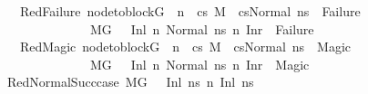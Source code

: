 \begin{isabellebody}
\ \ {\isacharbar}{\kern0pt}\ RedFailure{\isacharcolon}{\kern0pt}\ {\isachardoublequoteopen}{\isasymlbrakk}node{\isacharunderscore}{\kern0pt}to{\isacharunderscore}{\kern0pt}block{\isacharparenleft}{\kern0pt}G{\isacharparenright}{\kern0pt}\ {\isacharbang}{\kern0pt}\ n\ {\isacharequal}{\kern0pt}\ cs{\isacharsemicolon}{\kern0pt}\ M{\isacharcomma}{\kern0pt}{\isasymLambda}{\isacharcomma}{\kern0pt}{\isasymGamma}{\isacharcomma}{\kern0pt}{\isasymOmega}\ {\isasymturnstile}\ {\isasymlangle}cs{\isacharcomma}{\kern0pt}Normal\ ns{\isasymrangle}\ {\isacharbrackleft}{\kern0pt}{\isasymrightarrow}{\isacharbrackright}{\kern0pt}\ Failure\ {\isasymrbrakk}\ {\isasymLongrightarrow}\isanewline
\ \ \ \ \ \ \ \ \ \ \ \ \ \ M{\isacharcomma}{\kern0pt}{\isasymLambda}{\isacharcomma}{\kern0pt}{\isasymGamma}{\isacharcomma}{\kern0pt}{\isasymOmega}{\isacharcomma}{\kern0pt}G\ \ {\isasymturnstile}\ {\isacharparenleft}{\kern0pt}Inl\ n{\isacharcomma}{\kern0pt}\ Normal\ ns{\isacharparenright}{\kern0pt}\ {\isacharminus}{\kern0pt}n{\isasymrightarrow}\ {\isacharparenleft}{\kern0pt}Inr\ {\isacharparenleft}{\kern0pt}{\isacharparenright}{\kern0pt}{\isacharcomma}{\kern0pt}\ Failure{\isacharparenright}{\kern0pt}{\isachardoublequoteclose}\isanewline
\ \ {\isacharbar}{\kern0pt}\ RedMagic{\isacharcolon}{\kern0pt}\ {\isachardoublequoteopen}{\isasymlbrakk}node{\isacharunderscore}{\kern0pt}to{\isacharunderscore}{\kern0pt}block{\isacharparenleft}{\kern0pt}G{\isacharparenright}{\kern0pt}\ {\isacharbang}{\kern0pt}\ n\ {\isacharequal}{\kern0pt}\ cs{\isacharsemicolon}{\kern0pt}\ M{\isacharcomma}{\kern0pt}{\isasymLambda}{\isacharcomma}{\kern0pt}{\isasymGamma}{\isacharcomma}{\kern0pt}{\isasymOmega}\ {\isasymturnstile}\ {\isasymlangle}cs{\isacharcomma}{\kern0pt}Normal\ ns{\isasymrangle}\ {\isacharbrackleft}{\kern0pt}{\isasymrightarrow}{\isacharbrackright}{\kern0pt}\ Magic\ {\isasymrbrakk}\ {\isasymLongrightarrow}\isanewline
\ \ \ \ \ \ \ \ \ \ \ \ \ \ M{\isacharcomma}{\kern0pt}{\isasymLambda}{\isacharcomma}{\kern0pt}{\isasymGamma}{\isacharcomma}{\kern0pt}{\isasymOmega}{\isacharcomma}{\kern0pt}G\ \ {\isasymturnstile}\ {\isacharparenleft}{\kern0pt}Inl\ n{\isacharcomma}{\kern0pt}\ Normal\ ns{\isacharparenright}{\kern0pt}\ {\isacharminus}{\kern0pt}n{\isasymrightarrow}\ {\isacharparenleft}{\kern0pt}Inr\ {\isacharparenleft}{\kern0pt}{\isacharparenright}{\kern0pt}{\isacharcomma}{\kern0pt}\ Magic{\isacharparenright}{\kern0pt}{\isachardoublequoteclose}\isanewline
\isanewline
{}\isamarkupfalse%
\ RedNormalSucc{\isacharunderscore}{\kern0pt}case{\isacharcolon}{\kern0pt}\ {\isachardoublequoteopen}M{\isacharcomma}{\kern0pt}{\isasymLambda}{\isacharcomma}{\kern0pt}{\isasymGamma}{\isacharcomma}{\kern0pt}G{\isacharcomma}{\kern0pt}{\isasymOmega}\ \ {\isasymturnstile}\ {\isacharparenleft}{\kern0pt}Inl\ n{\isacharcomma}{\kern0pt}s{\isacharparenright}{\kern0pt}\ {\isacharminus}{\kern0pt}n{\isasymrightarrow}\ {\isacharparenleft}{\kern0pt}Inl\ n{\isacharprime}{\kern0pt}{\isacharcomma}{\kern0pt}s{\isacharprime}{\kern0pt}{\isacharparenright}{\kern0pt}{\isachardoublequoteclose}%

\end{isabellebody}
